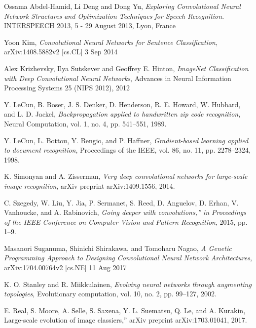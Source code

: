 \documentclass[conference]{IEEEtran}
\begin{document}
\begin{thebibliography}{}

Ossama Abdel-Hamid, Li Deng and Dong Yu, \emph{Exploring Convolutional Neural Network Structures and Optimization Techniques for Speech Recognition}. INTERSPEECH 2013, 5 - 29 August 2013, Lyon, France

Yoon Kim, \emph{Convolutional Neural Networks for Sentence Classification}, arXiv:1408.5882v2 [cs.CL] 3 Sep 2014

Alex Krizhevsky, Ilya Sutskever and Geoffrey E. Hinton, \emph{ImageNet Classification with Deep Convolutional Neural Networks}, Advances in Neural Information Processing Systems 25 (NIPS 2012), 2012

Y. LeCun, B. Boser, J. S. Denker, D. Henderson, R. E. Howard, W. Hubbard, and L. D. Jackel, \emph{Backpropagation applied to handwritten zip code recognition}, Neural Computation, vol. 1, no. 4, pp. 541–551, 1989.

Y. LeCun, L. Bottou, Y. Bengio, and P. Haffner, \emph{Gradient-based learning applied to document recognition}, Proceedings of the IEEE, vol. 86, no. 11, pp. 2278–2324, 1998.

K. Simonyan and A. Zisserman, \emph{Very deep convolutional networks for large-scale image recognition}, arXiv preprint arXiv:1409.1556, 2014.

C. Szegedy, W. Liu, Y. Jia, P. Sermanet, S. Reed, D. Anguelov, D. Erhan, V. Vanhoucke, and A. Rabinovich, \emph{Going deeper with convolutions,” in Proceedings of the IEEE Conference on Computer Vision and Pattern Recognition}, 2015, pp. 1–9.

Masanori Suganuma, Shinichi Shirakawa, and Tomoharu Nagao, \emph{A Genetic Programming Approach to Designing Convolutional Neural Network Architectures}, arXiv:1704.00764v2  [cs.NE]  11 Aug 2017

K. O. Stanley and R. Miikkulainen, \emph{Evolving neural networks through augmenting topologies}, Evolutionary computation, vol. 10, no. 2, pp. 99–127, 2002.

E. Real, S. Moore, A. Selle, S. Saxena, Y. L. Suematsu, Q. Le, and A. Kurakin, Large-scale evolution of image classiers,” arXiv preprint arXiv:1703.01041, 2017.


\end{thebibliography}
\end{document}
